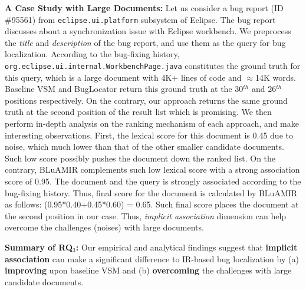 \documentclass[conference]{IEEEtran}
\begin{document}
\textbf{A Case Study with Large Documents:} Let us consider a bug report (ID \#95561) from \texttt{eclipse.ui.platform} subsystem of Eclipse. The bug report discusses about a synchronization issue with Eclipse workbench. We preprocess the \emph{title} and \emph{description} of the bug report, and use them as the query for bug localization. According to the bug-fixing history, \texttt{org.eclipse.ui.internal.WorkbenchPage.java} constitutes the ground truth for this query, which is a large document with 4K+ lines of code and $\approx$14K words. Baseline VSM \cite{vector-space-model} and BugLocator \cite{Jian} return this ground truth at the 30$^{th}$ and 26$^{th}$ positions respectively. On the contrary, our approach returns the same ground truth at the second position of the result list which is promising. We then perform in-depth analysis on the ranking mechanism of each approach, and make interesting observations. First, the lexical score for this document is 0.45 due to noise, which much lower than that of the other smaller candidate documents. Such low score possibly pushes the document down the ranked list. On the contrary, BLuAMIR complements such low lexical score with a strong association score of 0.95. The document and the query is strongly associated according to the bug-fixing history. Thus, final score for the document is calculated by BLuAMIR as follows:  (0.95*0.40+0.45*0.60) = 0.65. Such final score places the document at the second position in our case. Thus, \emph{implicit association} dimension can help overcome the challenges (noises) with large documents. 

\begin{framed}
	\noindent
	\textbf{Summary of RQ$_3$:} Our empirical and analytical findings suggest that \textbf{implicit association} can make a significant difference to IR-based bug localization by (a) \textbf{improving} upon baseline VSM and (b) \textbf{overcoming} the challenges with large candidate documents.    
\end{framed}







\end{document}
